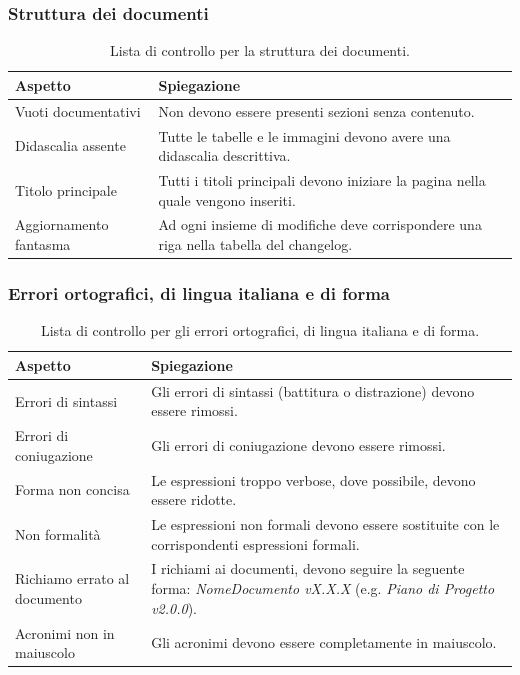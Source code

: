 \documentclass[8pt]{article}
\begin{document}
\subsubsection{Struttura dei documenti}
\renewcommand{\arraystretch}{2.5}
\begin{longtable}{|>{\centering}p{5cm}|>{\centering\arraybackslash}p{10cm}|}
\hline
\rowcolor{white}
    \textbf{Aspetto} & \textbf{Spiegazione} \\
\hline
\endfirsthead
\rowcolor{white}
\caption{Lista di controllo per la struttura dei documenti.}
\label{table:Lista di controllo per la struttura dei documenti}
\endlastfoot
    Vuoti documentativi & Non devono essere presenti sezioni senza contenuto. \\
\hline
    Didascalia assente & Tutte le tabelle e le immagini devono avere una didascalia descrittiva. \\
\hline    
Titolo principale & Tutti i titoli principali devono iniziare la pagina nella quale vengono
    inseriti. \\
\hline
    Aggiornamento fantasma & Ad ogni insieme di modifiche deve corrispondere una riga nella tabella
    del changelog. \\


    \hline
\end{longtable}
\subsubsection{Errori ortografici, di lingua italiana e di forma}
\renewcommand{\arraystretch}{2.5}
\begin{longtable}{|>{\centering}p{5cm}|>{\centering\arraybackslash}p{10cm}|}
\hline
\rowcolor{white}
    \textbf{Aspetto} & \textbf{Spiegazione} \\
\hline
\endfirsthead
\rowcolor{white}
\caption{Lista di controllo per gli errori ortografici, di lingua italiana e di forma.}
\label{table:Lista di controllo per gli errori ortografici, di lingua italiana e di forma}
\endlastfoot
    Errori di sintassi & Gli errori di sintassi (battitura o distrazione) devono essere rimossi.\\
\hline
    Errori di coniugazione & Gli errori di coniugazione devono essere rimossi. \\
\hline
    Forma non concisa & Le espressioni troppo verbose, dove possibile, devono essere ridotte.\\
\hline
    Non formalità & Le espressioni non formali devono essere sostituite con le corrispondenti
    espressioni formali. \\
\hline
    Richiamo errato al documento & I richiami ai documenti, devono seguire la seguente forma:
    \textit{NomeDocumento vX.X.X} (e.g. \textit{Piano di Progetto v2.0.0}).\\
\hline
    Acronimi non in maiuscolo & Gli acronimi devono essere completamente in maiuscolo. \\
\hline
\end{longtable}
\end{document}

